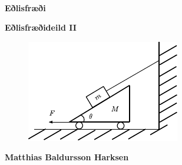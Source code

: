 \pagestyle{empty}

\,

\vspace{5cm}

\begin{center}
    \textbf{\Huge{Eðlisfræði}}
\end{center}

\begin{center}
    \textbf{\Large{Eðlisfræðideild II}}
\end{center}


\begin{figure}[H]
    \centering
    \includegraphics[scale = 2]{figures/forsidumynd.pdf}
\end{figure}

\vspace{7cm}

\begin{center}
    \textbf{\Large{Matthias Baldursson Harksen}}
\end{center}



\newpage